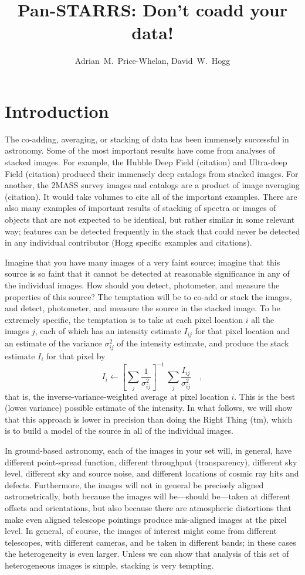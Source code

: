 \documentclass[12pt,preprint]{aastex}
\title{Pan-STARRS: Don't coadd your data!}
\author{
  Adrian~M.~Price-Whelan\altaffilmark{\ref{col}},
  David~W.~Hogg\altaffilmark{\ref{CCPP},\ref{email}}
}
\begin{document}
\section{Introduction}
The co-adding, averaging, or stacking of data has been immensely
successful in astronomy.  Some of the most important results have come
from analyses of stacked images.  For example, the Hubble Deep Field
(citation) and Ultra-deep Field (citation) produced their immensely
deep catalogs from stacked images.  For another, the 2MASS survey
images and catalogs are a product of image averaging (citation).  It
would take volumes to cite all of the important examples.  There are
also many examples of important results of stacking of spectra or
images of objects that are not expected to be identical, but rather
similar in some relevant way; features can be detected frequently in
the stack that could never be detected in any individual contributor
(Hogg specific examples and citations).

Imagine that you have many images of a very faint source; imagine that
this source is so faint that it cannot be detected at reasonable
significance in any of the individual images.  How should you detect,
photometer, and measure the properties of this source?  The temptation
will be to co-add or stack the images, and detect, photometer, and
measure the source in the stacked image.  To be extremely specific,
the temptation is to take at each pixel location $i$ all the images
$j$, each of which has an intensity estimate $I_{ij}$ for that pixel
location and an estimate of the variance $\sigma_{ij}^2$ of the
intensity estimate, and produce the stack estimate $I_i$ for that
pixel by
\begin{equation}
I_i \leftarrow \left[\sum_j \frac{1}{\sigma_{ij}^2}\right]^{-1}
  \,\sum_j \frac{I_{ij}}{\sigma_{ij}^2}
\quad ,
\end{equation}
that is, the inverse-variance-weighted average at pixel location $i$.
This is the best (lowes variance) possible estimate of the intensity.
In what follows, we will show that this approach is lower in precision
than doing the Right Thing (tm), which is to build a model of the
source in all of the individual images.

In ground-based astronomy, each of the images in your set will, in
general, have different point-spread function, different throughput
(transparency), different sky level, different sky and source noise,
and different locations of cosmic ray hits and defects.  Furthermore,
the images will not in general be precisely aligned astrometrically,
both because the images will be---should be---taken at different
offsets and orientations, but also because there are atmospheric
distortions that make even aligned telescope pointings produce
mis-aligned images at the pixel level.  In general, of course, the
images of interest might come from different telescopes, with
different cameras, and be taken in different bands; in these cases the
heterogeneity is even larger.  Unless we can show that analysis of
this set of heterogeneous images is simple, stacking is very tempting.
\end{document}
